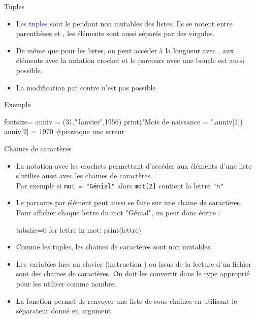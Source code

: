 \documentclass[10pt]{beamer}
\begin{document}
\begin{frame}[fragile]{\Ctitle}{\stitle}
	\begin{alertblock}{Tuples}
		\begin{itemize}
			\item<1-> Les \textcolor{blue}{tuples} sont le pendant non mutables des listes. Ils se notent entre parenthèses \kw{(} et \kw{)}, les éléments sont aussi séparés par des virgules.
			\item<1-> De même que pour les listes, on peut accéder à la longueur avec , aux éléments avec la notation crochet et le parcours avec une boucle  est aussi possible.
			\item<1-> La modification par contre n'est pas possible
		\end{itemize}
	\end{alertblock}
	\begin{exampleblock}{Exemple}
		\begin{codepython*}{fontsize=\small}
			anniv = (31,"Janvier",1956)
			print("Mois de naissance = ",anniv[1])
			anniv[2] = 1970 #provoque une erreur
		\end{codepython*}
	\end{exampleblock}
\end{frame}

\begin{frame}[fragile]{\Ctitle}{\stitle}
	\begin{alertblock}{Chaines de caractères}
		\begin{itemize}
			\item<1-> La notation avec les crochets permettant d'accéder aux éléments d'une liste s'utilise aussi avec les chaines de caractères. \\
				\onslide<2-> Par exemple si \texttt{mot = "Génial"} alors \texttt{mot[2]} contient la lettre \texttt{"n"}
			\item<3-> Le parcours par élément peut aussi se faire sur une chaine de caractères. \\
				\onslide<4-> Pour afficher chaque lettre du mot "Génial", on peut donc écrire :
				\onslide<5->\begin{codepython*}{tabsize=0}
					for lettre in mot:
					print(lettre)
				\end{codepython*}
			\item<6-> Comme les tuples, les chaines de caractères sont non mutables.
			\item<7-> \textcolor{blue}{\small \important} Les variables lues au clavier (instruction ) ou issus de la lecture d'un fichier sont des chaines de caractères. On doit les convertir dans le type approprié pour les utiliser comme nombre.
			\item<8-> La fonction  permet de renvoyer une liste de sous chaines en utilisant le séparateur donné en argument.
		\end{itemize}
	\end{alertblock}
\end{frame}
\end{document}
